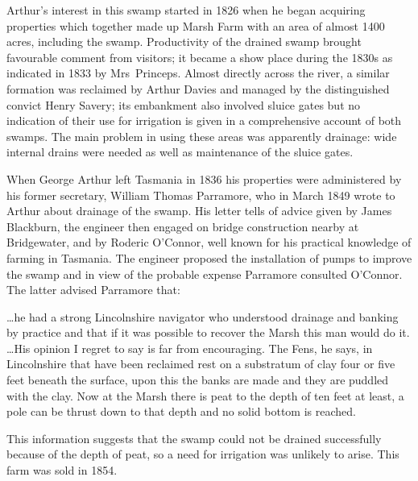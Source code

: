 Arthur's interest in this swamp started in 1826 when he began
acquiring properties which together made up Marsh Farm with an area of
almost 1400\,acres, including the swamp.  Productivity of the drained
swamp brought favourable comment from visitors; it became a show place
during the 1830s as indicated in 1833 by Mrs~Princeps.  Almost
directly across the river, a similar formation was reclaimed by Arthur
Davies and managed by the distinguished convict
Henry Savery; its embankment also involved
sluice gates but no
indication of their use for irrigation is given in a comprehensive
account of both swamps.  The main problem in using these areas was
apparently drainage: wide internal drains were needed
as well as maintenance of the sluice gates.

When George Arthur left Tasmania in 1836 his properties were
administered by his former secretary, William Thomas
Parramore, who in March 1849 wrote to Arthur
about drainage of the swamp.  His letter tells of
advice given by James Blackburn, the engineer
then engaged on bridge construction nearby at Bridgewater, and by
Roderic O'Connor,  well known for his practical
knowledge of farming in Tasmania.  The engineer proposed the
installation of pumps to improve the swamp and in view of the probable
expense Parramore consulted O'Connor.  The latter advised Parramore
that:
\begin{Quote}
	\ldots he had a strong Lincolnshire navigator who understood
	drain\-age and banking by practice and that if it was possible
	to recover the Marsh this man would do it. \ldots His opinion
	I regret to say is far from encouraging.  The Fens, he says,
	in Lincolnshire that have been reclaimed rest on a substratum
	of clay four or five feet beneath the surface, upon this the
	banks are made and they are puddled with the clay.  Now at the
	Marsh there is peat to the depth of ten feet at least, a pole
	can be thrust down to that depth and no solid bottom is
	reached.
\end{Quote}
This information suggests that the swamp could not be drained
successfully because of the depth of peat, so a need for irrigation
was unlikely to arise.  This farm was sold in 1854.

